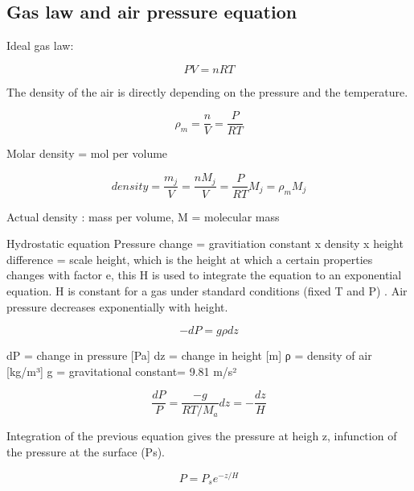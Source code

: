 \documentclass[12pt,oneside]{book}
\begin{document}
\subsection{Gas law and air pressure
equation}\label{gas-law-and-air-pressure-equation}

Ideal gas law:

\begin{equation} 
  PV = nRT
   \label{eq:Eqgaslaw}
\end{equation}

The density of the air is directly depending on the pressure and the
temperature.

\begin{equation} 
  \rho_m = \frac{n}{V} = \frac{P}{RT}
  \label{eq:Eqairdensity}
\end{equation}

Molar density = mol per volume

\begin{equation} 
  density = \frac{m_j}{V} = \frac{nM_j}{V} = \frac{P}{RT}M_j = \rho_m M_j
   \label{eq:Eqdensity}
\end{equation}

Actual density : mass per volume, M = molecular mass

Hydrostatic equation Pressure change = gravitiation constant x density x
height difference = scale height, which is the height at which a certain
properties changes with factor e, this H is used to integrate the
equation to an exponential equation. H is constant for a gas under
standard conditions (fixed T and P) . Air pressure decreases
exponentially with height.

\begin{equation} 
  -dP = g \rho dz
   \label{eq:Eqhydrostatic}
\end{equation}

dP = change in pressure {[}Pa{]} dz = change in height {[}m{]} ρ =
density of air {[}kg/m³{]} g = gravitational constant= 9.81 m/s²

\begin{equation} 
  \frac{dP}{P} = \frac{-g}{RT / M_a}  dz = - \frac{dz}{H}
   \label{eq:Eqhydrostatic2}
\end{equation}

Integration of the previous equation gives the pressure at heigh z,
infunction of the pressure at the surface (Ps).

\begin{equation} 
  P = P_s e^{-z/H}
   \label{eq:Eqhydrostatic3}
\end{equation}
\end{document}
